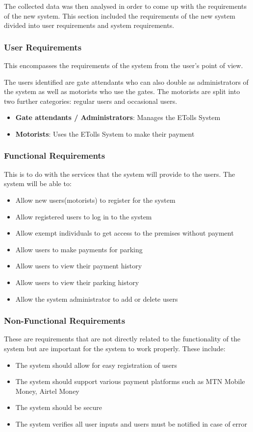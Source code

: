 The collected data was then analysed in order to come up with the requirements of the new system. This section included the requirements of the new system divided into user requirements and system requirements.

\subsubsection{User Requirements}
This encompasses the requirements of the system from the user’s point of view.

The users identified are gate attendants who can also double as administrators of the system as well as motorists who use the gates. The motorists are split into two further categories: regular users and occasional users.
\begin{itemize}
    \item \textbf{Gate attendants / Administrators}: Manages the ETolls System
    \item \textbf{Motorists}: Uses the ETolls System to make their payment
\end{itemize}

\subsubsection{Functional Requirements}
This is to do with the services that the system will provide to the users. The system will be able to:
\begin{itemize}
    \item Allow new users(motorists) to register for the system
    \item Allow registered users to log in to the system
    \item Allow exempt individuals to get access to the premises without payment
    \item Allow users to make payments for parking
    \item Allow users to view their payment history
    \item Allow users to view their parking history
    \item Allow the system administrator to add or delete users
\end{itemize}

\subsubsection{Non-Functional Requirements}
These are requirements that are not directly related to the functionality of the system but are important for the system to work properly. These include:
\begin{itemize}
    \item The system should allow for easy registration of users
    \item The system should support various payment platforms such as MTN Mobile Money, Airtel Money
    \item The system should be secure
    \item The system verifies all user inputs and users must be notified in case of error
\end{itemize}

